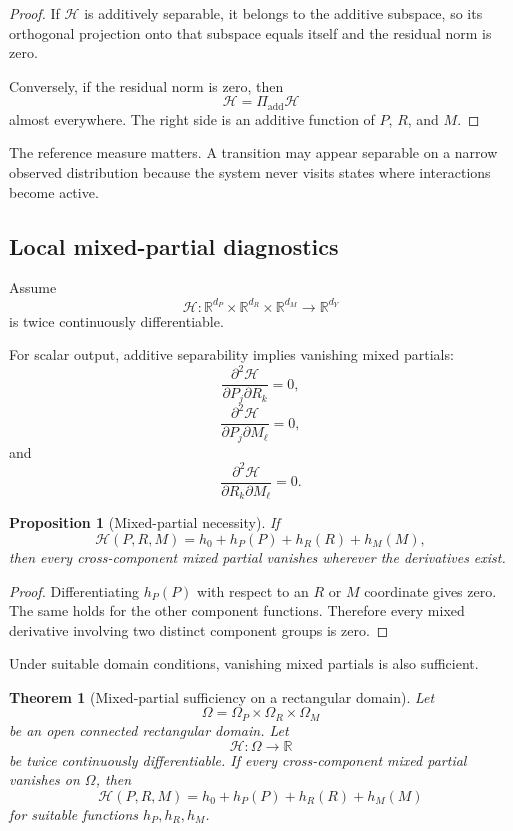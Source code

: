 \documentclass[11pt]{article}
\newtheorem{theorem}[definition]{Theorem}
\newtheorem{proposition}[definition]{Proposition}
\theoremstyle{definition}
\newcommand{\R}{\mathbb{R}}
\newcommand{\Hh}{\mathcal{H}}
\begin{document}
\begin{proof}
If \(\Hh\) is additively separable, it belongs to the additive subspace, so its orthogonal projection onto that subspace equals itself and the residual norm is zero.

Conversely, if the residual norm is zero, then
\[
\Hh=\Pi_{\mathrm{add}}\Hh
\]
almost everywhere. The right side is an additive function of \(P\), \(R\), and \(M\).
\end{proof}

The reference measure matters. A transition may appear separable on a narrow observed distribution because the system never visits states where interactions become active.

\subsection{Local mixed-partial diagnostics}

Assume
\[
\Hh:\R^{d_P}\times\R^{d_R}\times\R^{d_M}\to\R^{d_Y}
\]
is twice continuously differentiable.

For scalar output, additive separability implies vanishing mixed partials:
\[
\frac{\partial^2\Hh}
{\partial P_j\partial R_k}
=
0,
\]
\[
\frac{\partial^2\Hh}
{\partial P_j\partial M_\ell}
=
0,
\]
and
\[
\frac{\partial^2\Hh}
{\partial R_k\partial M_\ell}
=
0.
\]

\begin{proposition}[Mixed-partial necessity]
If
\[
\Hh(P,R,M)
=
h_0+h_P(P)+h_R(R)+h_M(M),
\]
then every cross-component mixed partial vanishes wherever the derivatives exist.
\end{proposition}

\begin{proof}
Differentiating \(h_P(P)\) with respect to an \(R\) or \(M\) coordinate gives zero. The same holds for the other component functions. Therefore every mixed derivative involving two distinct component groups is zero.
\end{proof}

Under suitable domain conditions, vanishing mixed partials is also sufficient.

\begin{theorem}[Mixed-partial sufficiency on a rectangular domain]
Let
\[
\Omega
=
\Omega_P\times\Omega_R\times\Omega_M
\]
be an open connected rectangular domain. Let
\[
\Hh:\Omega\to\R
\]
be twice continuously differentiable. If every cross-component mixed partial vanishes on \(\Omega\), then
\[
\Hh(P,R,M)
=
h_0+h_P(P)+h_R(R)+h_M(M)
\]
for suitable functions \(h_P,h_R,h_M\).
\end{theorem}
\end{document}
